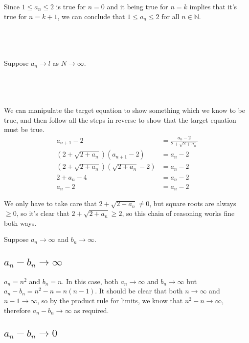 \documentclass[a4paper]{article}
\begin{document}
Since $1 \le a_n \le 2$ is true for $n=0$ and it being true for $n=k$ implies that it's true for $n=k+1$, we can conclude that $1 \le a_n \le 2$ for all $n \in \mathbb N$.

\subsection{~}

Suppose $a_n \to l$ as $N \to \infty$.

\subsection{~}

We can manipulate the target equation to show something which we know to be true, and then follow all the steps in reverse to show that the target equation must be true.
\begin{align*}
	a_{n+1} - 2 &= \frac{a_n - 2}{2 + \sqrt{2 + a_n}}\\
	\left( 2 + \sqrt{2 + a_n} \right) (a_{n+1} - 2) &= a_n - 2\\
	\left( 2 + \sqrt{2 + a_n} \right) \left( \sqrt{2 + a_n} - 2 \right) &= a_n - 2\\
	2 + a_n - 4 &= a_n - 2\\
	a_n - 2 &= a_n - 2
\end{align*}

We only have to take care that $2 + \sqrt{2 + a_n} \ne 0$, but square roots are always $\ge 0$, so it's clear that $2 + \sqrt{2 + a_n} \ge 2$, so this chain of reasoning works fine both ways.


Suppose $a_n \to \infty$ and $b_n \to \infty$.

\subsection{$a_n - b_n \to \infty$}

$a_n = n^2$ and $b_n = n$. In this case, both $a_n \to \infty$ and $b_n \to \infty$ but $a_n - b_n = n^2 - n = n (n-1)$. It should be clear that both $n \to \infty$ and $n-1 \to \infty$, so by the product rule for limits, we know that $n^2 - n \to \infty$, therefore $a_n - b_n \to \infty$ as required.

\subsection{$a_n - b_n \to 0$}
\end{document}
